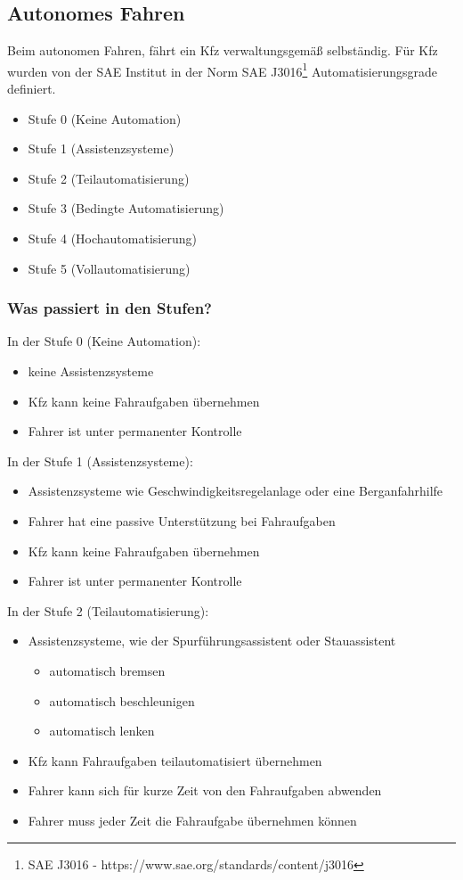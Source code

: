 \subsection{Autonomes Fahren}

Beim autonomen Fahren, fährt ein \ac{Kfz} verwaltungsgemäß selbständig.
Für \ac{Kfz} wurden von der \ac{SAE} Institut in der Norm SAE J3016\footnote{SAE J3016 - https://www.sae.org/standards/content/j3016} Automatisierungsgrade definiert.
\begin{itemize}
	\item Stufe 0 (Keine Automation)
	\item Stufe 1 (Assistenzsysteme)
	\item Stufe 2 (Teilautomatisierung)
	\item Stufe 3 (Bedingte Automatisierung)
	\item Stufe 4 (Hochautomatisierung)
	\item Stufe 5 (Vollautomatisierung)
\end{itemize}
\subsubsection{Was passiert in den Stufen?}
In der Stufe 0 (Keine Automation):
\begin{itemize}
	\item keine Assistenzsysteme
	\item \ac{Kfz} kann keine Fahraufgaben übernehmen
	\item Fahrer ist unter permanenter Kontrolle
\end{itemize}

In der Stufe 1 (Assistenzsysteme):
\begin{itemize}
	\item Assistenzsysteme wie Geschwindigkeitsregelanlage oder eine Berganfahrhilfe
	\item Fahrer hat eine passive Unterstützung bei Fahraufgaben
	\item \ac{Kfz} kann keine Fahraufgaben übernehmen
	\item Fahrer ist unter permanenter Kontrolle
\end{itemize}

In der Stufe 2 (Teilautomatisierung):
\begin{itemize}
	\item Assistenzsysteme, wie der Spurführungsassistent oder Stauassistent
	      \begin{itemize}
		      \item automatisch bremsen
		      \item automatisch beschleunigen
		      \item automatisch lenken
	      \end{itemize}
	\item \ac{Kfz} kann Fahraufgaben teilautomatisiert übernehmen
	\item Fahrer kann sich für kurze Zeit von den Fahraufgaben abwenden
	\item Fahrer muss jeder Zeit die Fahraufgabe übernehmen können
\end{itemize}


